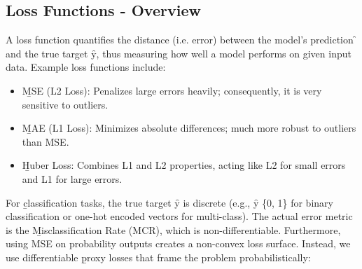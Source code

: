 \subsection{Loss Functions - Overview}
A loss function \pL quantifies the distance (i.e. error) between the model's prediction \f{} and the true target \f{y}, thus measuring how well a model performs on given input data. Example loss functions include:
\begin{itemize}
\item \b{MSE (L2 Loss)}: Penalizes large errors heavily; consequently, it is very sensitive to outliers.
\item \b{MAE (L1 Loss)}: Minimizes absolute differences; much more robust to outliers than MSE.
\item \b{Huber Loss}: Combines L1 and L2 properties, acting like L2 for small errors and L1 for large errors.
\end{itemize}
\vspace{.5em}
For \b{classification tasks}, the true target \f{y} is discrete (e.g., \f{y \in \{0, 1\}} for binary classification or one-hot encoded vectors for multi-class). The actual error metric is the \b{Misclassification Rate (MCR)}, which is non-differentiable. Furthermore, using MSE on probability outputs creates a non-convex loss surface. Instead, we use differentiable \b{proxy losses} that frame the problem probabilistically:
